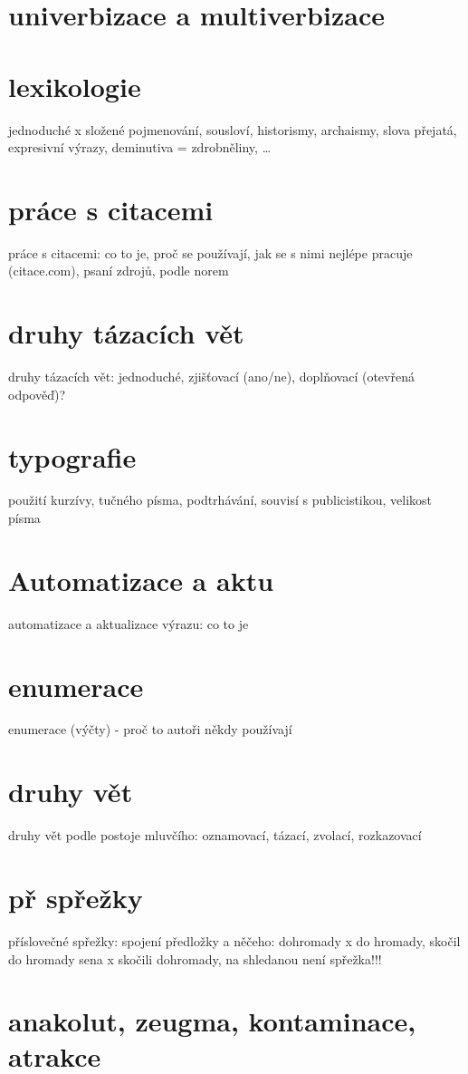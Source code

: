 \documentclass{memoir}
\begin{document}
\section*{univerbizace a multiverbizace}

\section*{lexikologie}
jednoduché x složené pojmenování, sousloví, historismy, archaismy, slova přejatá, expresivní výrazy, deminutiva = zdrobněliny, …

\section*{práce s citacemi}
práce s citacemi: co to je, proč se používají, jak se s nimi nejlépe pracuje (citace.com), psaní zdrojů, podle norem

\section*{druhy tázacích vět}
druhy tázacích vět: jednoduché, zjišťovací (ano/ne), doplňovací (otevřená odpověď)?

\section*{typografie}
použití kurzívy, tučného písma, podtrhávání, souvisí s publicistikou, velikost písma

\section*{Automatizace a aktu}
automatizace a aktualizace výrazu: co to je

\section*{enumerace}
enumerace (výčty) - proč to autoři někdy používají

\section*{druhy vět}
druhy vět podle postoje mluvčího: oznamovací, tázací, zvolací, rozkazovací

\section*{př spřežky}
příslovečné spřežky: spojení předložky a něčeho: dohromady x do hromady, skočil do hromady sena x skočili dohromady, na shledanou není spřežka!!!

\section*{anakolut, zeugma, kontaminace, atrakce}
\end{document}
